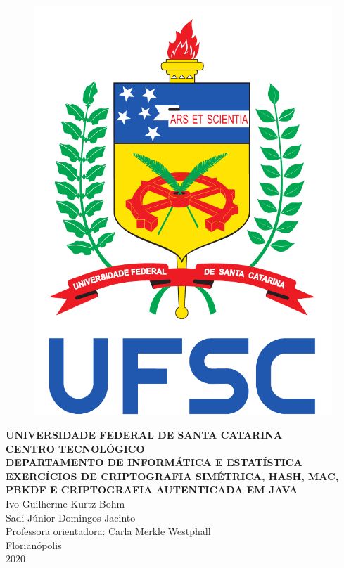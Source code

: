\documentclass[12pt,a4paper]{article}
\begin{document}
	\singlespacing
	\begin{titlepage}
		\begin{center}
			\begin{figure}[!htb]
				\center
				\includegraphics[scale=0.25]{pictures/Sigla.pdf} 
			\end{figure}
			{\bf UNIVERSIDADE FEDERAL DE SANTA CATARINA}\\[0.2cm]
			{\bf CENTRO TECNOLÓGICO}\\[0.2cm]
			{\bf DEPARTAMENTO DE INFORMÁTICA E ESTATÍSTICA}\\[5.5cm]
			{\bf \large EXERCÍCIOS DE CRIPTOGRAFIA SIMÉTRICA, HASH, MAC, PBKDF E CRIPTOGRAFIA AUTENTICADA EM JAVA}\\[3.6 cm]
			{Ivo Guilherme Kurtz Bohm}\\	
			{Sadi Júnior Domingos Jacinto}\\[1cm]
			{Professora orientadora: Carla Merkle Westphall}\\[4.1 cm]
			{Florianópolis}\\[0.2cm]
			{2020}
		\end{center}
	\end{titlepage}
	
\end{document}
